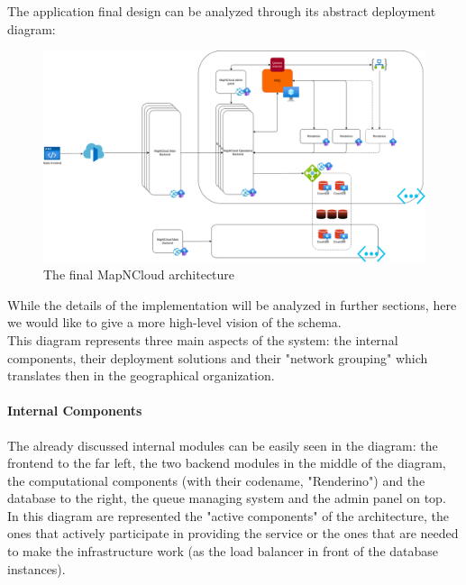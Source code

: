 The application final design can be analyzed through its abstract deployment diagram:
\begin{figure}[H]
  \centering
  \includegraphics[width = \textwidth]{../Images/SystemDesign-Final.drawio.png}
  \caption{The final MapNCloud architecture}
\end{figure}
While the details of the implementation will be analyzed in further sections, here we would like to give a more high-level vision of the schema.\\
This diagram represents three main aspects of the system: the internal components, their deployment solutions and their "network grouping" which translates then in the geographical organization.

\paragraph{Internal Components}
  The already discussed internal modules can be easily seen in the diagram: the frontend to the far left, the two backend modules in the middle of the diagram, the computational components (with their codename, "Renderino") and the database to the right, the queue managing system and the admin panel on top. In this diagram are represented the "active components" of the architecture, the ones that actively participate in providing the service or the ones that are needed to make the infrastructure work (as the load balancer in front of the database instances).

